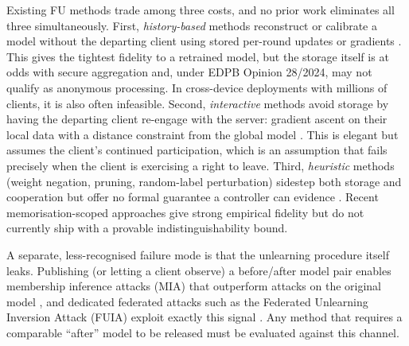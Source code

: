 Existing FU methods trade among three costs, and no prior work eliminates all three
simultaneously. First, \emph{history-based} methods reconstruct or calibrate a model
without the departing client using stored per-round updates or gradients
\cite{liu2021federaser,fraboni2024sifu,zhang2023fedrecovery}. This gives the tightest
fidelity to a retrained model, but the storage itself is at odds with secure aggregation
and, under EDPB Opinion 28/2024, may not qualify as anonymous processing. In
cross-device deployments with millions of clients, it is also often infeasible. Second,
\emph{interactive} methods avoid storage by having the departing client re-engage with
the server: gradient ascent on their local data with a distance constraint from the
global model \cite{halimi2022}. This is elegant but assumes the client's continued
participation, which is an assumption that fails precisely when the client is exercising
a right to leave. Third, \emph{heuristic} methods (weight negation, pruning,
random-label perturbation) sidestep both storage and cooperation but offer no formal
guarantee a controller can evidence \cite{khalil2025not,gu2024fedau}. Recent
memorisation-scoped approaches \cite{wei2026fedmemprune} give strong empirical fidelity
but do not currently ship with a provable indistinguishability bound.

A separate, less-recognised failure mode is that the unlearning procedure itself leaks.
Publishing (or letting a client observe) a before/after model pair enables membership
inference attacks (MIA) that outperform attacks on the original model
\cite{chen2021unlearningleaks}, and dedicated federated attacks such as the Federated
Unlearning Inversion Attack (FUIA) exploit exactly this signal \cite{fuia2025}. Any
method that requires a comparable ``after'' model to be released must be evaluated
against this channel.

